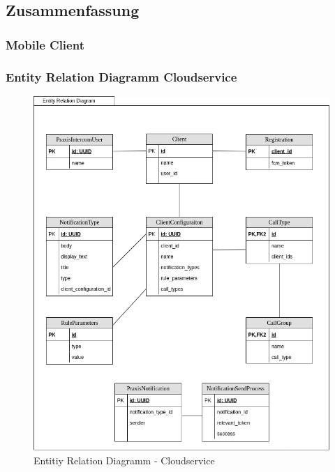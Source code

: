 \subsection{Zusammenfassung}

\subsubsection{Mobile Client}
\clearpage

\subsubsection{Entity Relation Diagramm Cloudservice}

\begin{figure}[h]
    \centering
    \begin{minipage}[b]{0.9\textwidth}
        \includegraphics[width=\textwidth]{graphics/diagramms/erd_v02}
        \caption{Entitiy Relation Diagramm - Cloudservice}
    \end{minipage}
\end{figure}

